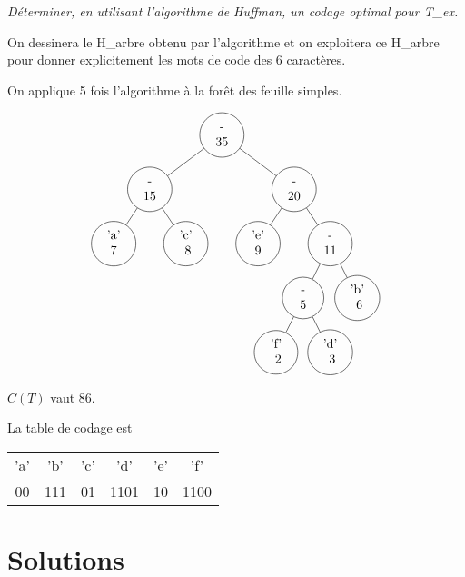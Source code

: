 \begin{Exercise}\it
Déterminer, en utilisant l’algorithme de Huffman, un codage optimal pour {\it T\_ex}. 

On dessinera le H\_arbre obtenu par l’algorithme et on exploitera ce H\_arbre pour donner
explicitement les mots de code des 6 caractères.
\end{Exercise}
\begin{Answer}
On applique 5 fois l'algorithme   à la forêt des feuille simples.

\[
\begin{tikzpicture}[level distance =15mm]
  \tikzstyle{level 1}=[sibling distance =4cm]
  \tikzstyle{level 2}=[sibling distance =2cm]
  \tikzstyle{level 3}=[sibling distance =15mm]
  \tikzstyle{every node}=[circle,draw,minimum size = 10mm]
  \node {\sur {-}{35}}
   child {node{\sur {-}{15}}
          child {node{\sur {'a'}{7}}}
          child {node{\sur {'c'}{\ 8}}}
         }
   child {node{\sur {-}{20}}
          child {node{\sur {'e'}{9}}}
          child {node{\sur {-}{11}}
                 child {node{\sur {-}{5}}
                        child {node{\sur {'f'}{\ 2}}}
                        child {node{\sur {'d'}{\ 3}}}
                       }
                 child {node{\sur {'b'}{\ 6}}}
                }
         };
\end{tikzpicture}
\]

$C(T)$ vaut 86.

La table de codage est

\begin{center}
  \begin{tabular}{cccccc}
    'a' & 'b' & 'c' & 'd'  & 'e' & 'f'  \\
    00  & 111 & 01  & 1101 & 10  & 1100 \\
  \end{tabular}
\end{center}\end{Answer}


\newpage
\section{Solutions}
\shipoutAnswer

